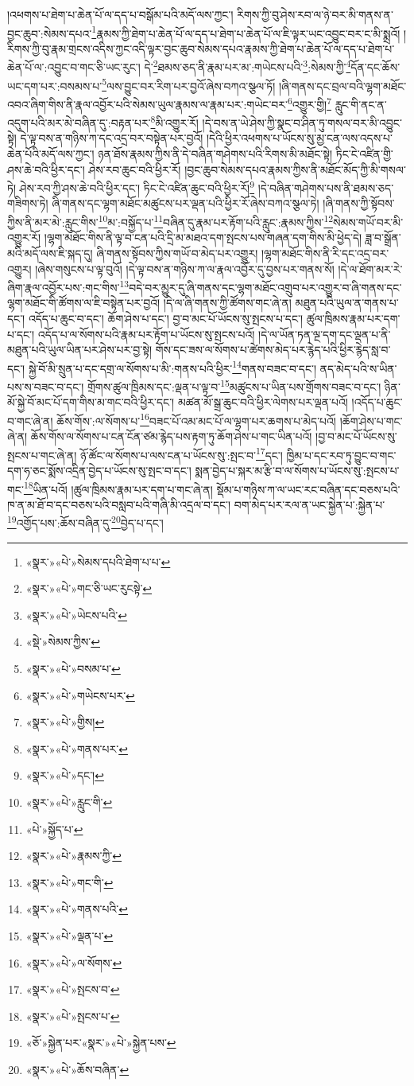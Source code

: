 །འཕགས་པ་ཐེག་པ་ཆེན་པོ་ལ་དད་པ་བསྒོམ་པའི་མདོ་ལས་ཀྱང་། རིགས་ཀྱི་བུ་ཤེས་རབ་ལ་ཉེ་བར་མི་གནས་ན་བྱང་ཆུབ་:སེམས་དཔའ་\footnote{«སྣར་»«པེ་»སེམས་དཔའི་ཐེག་པ་པ་}རྣམས་ཀྱི་ཐེག་པ་ཆེན་པོ་ལ་དད་པ་ཐེག་པ་ཆེན་པོ་ལ་ཇི་ལྟར་ཡང་འབྱུང་བར་ང་མི་སྨྲའོ། །རིགས་ཀྱི་བུ་རྣམ་གྲངས་འདིས་ཀྱང་འདི་ལྟར་བྱང་ཆུབ་སེམས་དཔའ་རྣམས་ཀྱི་ཐེག་པ་ཆེན་པོ་ལ་དད་པ་ཐེག་པ་ཆེན་པོ་ལ་:འབྱུང་བ་གང་ཅི་ཡང་རུང་། དེ་\footnote{«སྣར་»«པེ་»གང་ཅི་ཡང་རུངསྟེ་}ཐམས་ཅད་ནི་རྣམ་པར་མ་:གཡེངས་པའི་\footnote{«སྣར་»«པེ་»ཡེངས་པའི་}:སེམས་ཀྱི་\footnote{«སྡེ་»སེམས་ཀྱིས་}དོན་དང་ཆོས་ཡང་དག་པར་:བསམས་པ་\footnote{«སྣར་»«པེ་»བསམ་པ་}ལས་བྱུང་བར་རིག་པར་བྱའོ་ཞེས་བཀའ་སྩལ་ཏོ། །ཞི་གནས་དང་བྲལ་བའི་ལྷག་མཐོང་འབའ་ཞིག་གིས་ནི་རྣལ་འབྱོར་པའི་སེམས་ཡུལ་རྣམས་ལ་རྣམ་པར་:གཡེང་བར་\footnote{«སྣར་»«པེ་»གཡེངས་པར་}འགྱུར་གྱི།\footnote{«སྣར་»«པེ་»གྱིས།} རླུང་གི་ནང་ན་འདུག་པའི་མར་མེ་བཞིན་དུ་:བརྟན་པར་\footnote{«སྣར་»«པེ་»གནས་པར་}མི་འགྱུར་རོ། །དེ་བས་ན་ཡེ་ཤེས་ཀྱི་སྣང་བ་ཤིན་ཏུ་གསལ་བར་མི་འབྱུང་སྟེ། དེ་ལྟ་བས་ན་གཉིས་ཀ་དང་འདྲ་བར་བསྟེན་པར་བྱའོ། །དེའི་ཕྱིར་འཕགས་པ་ཡོངས་སུ་མྱ་ངན་ལས་འདས་པ་ཆེན་པོའི་མདོ་ལས་ཀྱང་། ཉན་ཐོས་རྣམས་ཀྱིས་ནི་དེ་བཞིན་གཤེགས་པའི་རིགས་མི་མཐོང་སྟེ། ཏིང་ངེ་འཛིན་གྱི་ཤས་ཆེ་བའི་ཕྱིར་དང་། ཤེས་རབ་ཆུང་བའི་ཕྱིར་རོ། །བྱང་ཆུབ་སེམས་དཔའ་རྣམས་ཀྱིས་ནི་མཐོང་མོད་ཀྱི་མི་གསལ་ཏེ། ཤེས་རབ་ཀྱི་ཤས་ཆེ་བའི་ཕྱིར་དང་། ཏིང་ངེ་འཛིན་ཆུང་བའི་ཕྱིར་རོ།\footnote{«སྣར་»«པེ་»དང་།} །དེ་བཞིན་གཤེགས་པས་ནི་ཐམས་ཅད་གཟིགས་ཏེ། ཞི་གནས་དང་ལྷག་མཐོང་མཚུངས་པར་ལྡན་པའི་ཕྱིར་རོ་ཞེས་བཀའ་སྩལ་ཏེ། །ཞི་གནས་ཀྱི་སྟོབས་ཀྱིས་ནི་མར་མེ་:རླུང་གིས་\footnote{«སྣར་»«པེ་»རླུང་གི་}མ་:བསྐྱོད་པ་\footnote{«པེ་»སྐྱོད་པ་}བཞིན་དུ་རྣམ་པར་རྟོག་པའི་རླུང་:རྣམས་ཀྱིས་\footnote{«སྣར་»«པེ་»རྣམས་ཀྱི་}སེམས་གཡོ་བར་མི་འགྱུར་རོ། །ལྷག་མཐོང་གིས་ནི་ལྟ་བ་ངན་པའི་དྲི་མ་མཐའ་དག་སྤངས་པས་གཞན་དག་གིས་མི་ཕྱེད་དེ། ཟླ་བ་སྒྲོན་མའི་མདོ་ལས་ཇི་སྐད་དུ། ཞི་གནས་སྟོབས་ཀྱིས་གཡོ་བ་མེད་པར་འགྱུར། །ལྷག་མཐོང་གིས་ནི་རི་དང་འདྲ་བར་འགྱུར། །ཞེས་གསུངས་པ་ལྟ་བུའོ། །དེ་ལྟ་བས་ན་གཉིས་ཀ་ལ་རྣལ་འབྱོར་དུ་བྱས་པར་གནས་སོ། །དེ་ལ་ཐོག་མར་རེ་ཞིག་རྣལ་འབྱོར་པས་:གང་གིས་\footnote{«སྣར་»«པེ་»གང་གི་}བདེ་བར་མྱུར་དུ་ཞི་གནས་དང་ལྷག་མཐོང་འགྲུབ་པར་འགྱུར་བ་ཞི་གནས་དང་ལྷག་མཐོང་གི་ཚོགས་ལ་ཇི་བསྟེན་པར་བྱའོ། །དེ་ལ་ཞི་གནས་ཀྱི་ཚོགས་གང་ཞེ་ན། མཐུན་པའི་ཡུལ་ན་གནས་པ་དང་། འདོད་པ་ཆུང་བ་དང་། ཆོག་ཤེས་པ་དང་། བྱ་བ་མང་པོ་ཡོངས་སུ་སྤངས་པ་དང་། ཚུལ་ཁྲིམས་རྣམ་པར་དག་པ་དང་། འདོད་པ་ལ་སོགས་པའི་རྣམ་པར་རྟོག་པ་ཡོངས་སུ་སྤངས་པའོ། །དེ་ལ་ཡོན་ཏན་ལྔ་དག་དང་ལྡན་པ་ནི་མཐུན་པའི་ཡུལ་ཡིན་པར་ཤེས་པར་བྱ་སྟེ། གོས་དང་ཟས་ལ་སོགས་པ་ཚེགས་མེད་པར་རྙེད་པའི་ཕྱིར་རྙེད་སླ་བ་དང་། སྐྱེ་བོ་མི་སྲུན་པ་དང་དགྲ་ལ་སོགས་པ་མི་:གནས་པའི་ཕྱིར་\footnote{«སྣར་»«པེ་»གནས་པའི་}གནས་བཟང་བ་དང་། ནད་མེད་པའི་ས་ཡིན་པས་ས་བཟང་བ་དང་། གྲོགས་ཚུལ་ཁྲིམས་དང་:ལྡན་པ་ལྟ་བ་\footnote{«སྣར་»«པེ་»ལྡན་པ་}མཚུངས་པ་ཡིན་པས་གྲོགས་བཟང་བ་དང་། ཉིན་མོ་སྐྱེ་བོ་མང་པོ་དག་གིས་མ་གང་བའི་ཕྱིར་དང་། མཚན་མོ་སྒྲ་ཆུང་བའི་ཕྱིར་ལེགས་པར་ལྡན་པའོ། །འདོད་པ་ཆུང་བ་གང་ཞེ་ན། ཆོས་གོས་:ལ་སོགས་པ་\footnote{«སྣར་»«པེ་»ལ་སོགས་}བཟང་པོ་འམ་མང་པོ་ལ་ལྷག་པར་ཆགས་པ་མེད་པའོ། །ཆོག་ཤེས་པ་གང་ཞེ་ན། ཆོས་གོས་ལ་སོགས་པ་ངན་ངོན་ཙམ་རྙེད་པས་རྟག་ཏུ་ཆོག་ཤེས་པ་གང་ཡིན་པའོ། །བྱ་བ་མང་པོ་ཡོངས་སུ་སྤངས་པ་གང་ཞེ་ན། ཉོ་ཚོང་ལ་སོགས་པ་ལས་ངན་པ་ཡོངས་སུ་:སྤང་བ་\footnote{«སྣར་»«པེ་»སྤངས་བ་}དང་། ཁྱིམ་པ་དང་རབ་ཏུ་བྱུང་བ་གང་དག་ཧ་ཅང་སྨོས་འདྲིན་བྱེད་པ་ཡོངས་སུ་སྤང་བ་དང་། སྨན་བྱེད་པ་སྐར་མ་རྩི་བ་ལ་སོགས་པ་ཡོངས་སུ་:སྤངས་པ་གང་\footnote{«སྣར་»«པེ་»སྤངས་པ་}ཡིན་པའོ། །ཚུལ་ཁྲིམས་རྣམ་པར་དག་པ་གང་ཞེ་ན། སྡོམ་པ་གཉིས་ཀ་ལ་ཡང་རང་བཞིན་དང་བཅས་པའི་ཁ་ན་མ་ཐོ་བ་དང་བཅས་པའི་བསླབ་པའི་གཞི་མི་འདྲལ་བ་དང་། བག་མེད་པར་རལ་ན་ཡང་སྐྱེན་པ་:སྐྱེན་པ་\footnote{«ཅོ་»སྐྱེན་པར་«སྣར་»«པེ་»སྐྱེན་པས་}འགྱོད་པས་:ཆོས་བཞིན་དུ་\footnote{«སྣར་»«པེ་»ཆོས་བཞིན་}བྱེད་པ་དང་། 